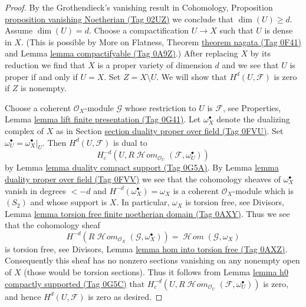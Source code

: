 \documentclass{amsart}
\theoremstyle{plain}
\theoremstyle{definition}
\theoremstyle{remark}
\numberwithin{equation}{subsection}
\def\SheafHom{\mathop{\mathcal{H}\!\mathit{om}}\nolimits}
\begin{document}
\begin{proof}
By the Grothendieck's vanishing result in
Cohomology, Proposition \href{https://stacks.math.columbia.edu/tag/02UZ}{proposition vanishing Noetherian (Tag 02UZ)}
we conclude that $\dim(U) \geq d$.
Assume $\dim(U) = d$. Choose a compactification $U \to X$
such that $U$ is dense in $X$. (This is possible by
More on Flatness, Theorem \href{https://stacks.math.columbia.edu/tag/0F41}{theorem nagata (Tag 0F41)} and
Lemma \href{https://stacks.math.columbia.edu/tag/0A9Z}{lemma compactifyable (Tag 0A9Z)}.) After replacing $X$ by its
reduction we find that $X$ is a proper variety of dimension $d$
and we see that $U$ is proper if and only if $U = X$.
Set $Z = X \setminus U$. We will show that $H^d(U, \mathcal{F})$
is zero if $Z$ is nonempty.

\medskip\noindent
Choose a coherent $\mathcal{O}_X$-module
$\mathcal{G}$ whose restriction to $U$ is $\mathcal{F}$, see
Properties, Lemma \href{https://stacks.math.columbia.edu/tag/0G41}{lemma lift finite presentation (Tag 0G41)}.
Let $\omega_X^\bullet$ denote the dualizing complex of $X$ as in
Section \href{https://stacks.math.columbia.edu/tag/0FVU}{section duality proper over field (Tag 0FVU)}.
Set $\omega_U^\bullet = \omega_X^\bullet|_U$.
Then $H^d(U, \mathcal{F})$ is dual to
$$
H^{-d}_c(U, R\SheafHom_{\mathcal{O}_U}(\mathcal{F}, \omega_U^\bullet))
$$
by Lemma \href{https://stacks.math.columbia.edu/tag/0G5A}{lemma duality compact support (Tag 0G5A)}. By
Lemma \href{https://stacks.math.columbia.edu/tag/0FVV}{lemma duality proper over field (Tag 0FVV)} we see that
the cohomology sheaves of $\omega_X^\bullet$ vanish in degrees $< -d$
and $H^{-d}(\omega_X^\bullet) = \omega_X$ is a coherent
$\mathcal{O}_X$-module which is $(S_2)$ and whose support is $X$.
In particular, $\omega_X$ is torsion free, see
Divisors, Lemma \href{https://stacks.math.columbia.edu/tag/0AXY}{lemma torsion free finite noetherian domain (Tag 0AXY)}.
Thus we see that the cohomology sheaf
$$
H^{-d}(R\SheafHom_{\mathcal{O}_X}(\mathcal{G}, \omega_X^\bullet)) =
\SheafHom(\mathcal{G}, \omega_X)
$$
is torsion free, see
Divisors, Lemma \href{https://stacks.math.columbia.edu/tag/0AXZ}{lemma hom into torsion free (Tag 0AXZ)}.
Consequently this sheaf has no nonzero sections vanishing
on any nonempty open of $X$ (those would be torsion sections).
Thus it follows from Lemma \href{https://stacks.math.columbia.edu/tag/0G5C}{lemma h0 compactly supported (Tag 0G5C)} that
$H^{-d}_c(U, R\SheafHom_{\mathcal{O}_U}(\mathcal{F}, \omega_U^\bullet))$
is zero, and hence $H^d(U, \mathcal{F})$ is zero as desired.
\end{proof}
\end{document}
